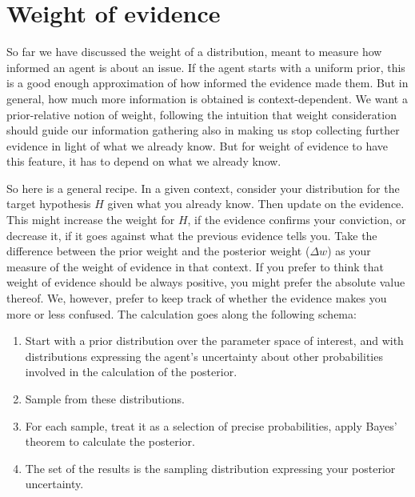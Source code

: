 \documentclass[
  10pt,
  dvipsnames,enabledeprecatedfontcommands]{scrartcl}
\begin{document}
\pagebreak


\hypertarget{weight-of-evidence}{%
\section{Weight of evidence}\label{weight-of-evidence}}

So far we have discussed the weight of a distribution, meant to measure
how informed an agent is about an issue. If the agent starts with a
uniform prior, this is a good enough approximation of how informed the
evidence made them. But in general, how much more information is
obtained is context-dependent. We want a prior-relative notion of
weight, following the intuition that weight consideration should guide
our information gathering also in making us stop collecting further
evidence in light of what we already know. But for weight of evidence to
have this feature, it has to depend on what we already know.

So here is a general recipe. In a given context, consider your
distribution for the target hypothesis \(H\) given what you already
know. Then update on the evidence. This might increase the weight for
\(H\), if the evidence confirms your conviction, or decrease it, if it
goes against what the previous evidence tells you. Take the difference
between the prior weight and the posterior weight (\(\Delta w\)) as your
measure of the weight of evidence in that context. If you prefer to
think that weight of evidence should be always positive, you might
prefer the absolute value thereof. We, however, prefer to keep track of
whether the evidence makes you more or less confused. The calculation
goes along the following schema:

\begin{enumerate}
\item Start with a prior distribution over the parameter space of interest, and with distributions expressing the agent's uncertainty about other probabilities involved in the calculation of the posterior.
\item Sample from these distributions.
\item For each sample, treat it as a selection of precise probabilities, apply Bayes' theorem to calculate the posterior.
\item The set of the results is the sampling distribution expressing your posterior uncertainty.
\end{enumerate}
\end{document}
